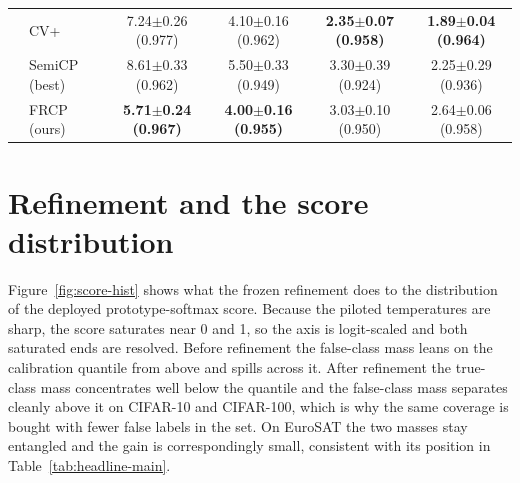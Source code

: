 \begin{table}[t]
\begin{tabular}{llcccc}
 & CV+ & 7.24$\pm$0.26 {\scriptsize(0.977)} & 4.10$\pm$0.16 {\scriptsize(0.962)} & \textbf{2.35$\pm$0.07 {\scriptsize(0.958)}} & \textbf{1.89$\pm$0.04 {\scriptsize(0.964)}}\\
 & SemiCP (best) & 8.61$\pm$0.33 {\scriptsize(0.962)} & 5.50$\pm$0.33 {\scriptsize(0.949)} & 3.30$\pm$0.39 {\scriptsize(0.924)} & 2.25$\pm$0.29 {\scriptsize(0.936)}\\
 & FRCP (ours) & \textbf{5.71$\pm$0.24 {\scriptsize(0.967)}} & \textbf{4.00$\pm$0.16 {\scriptsize(0.955)}} & 3.03$\pm$0.10 {\scriptsize(0.950)} & 2.64$\pm$0.06 {\scriptsize(0.958)}\\
\bottomrule
\end{tabular}
\end{table}
%
\section{Refinement and the score distribution}
\label{app:scorehist}

Figure~\ref{fig:score-hist} shows what the frozen refinement does to
the distribution of the deployed prototype-softmax score. Because the
piloted temperatures are sharp, the score saturates near 0 and 1, so
the axis is logit-scaled and both saturated ends are resolved. Before
refinement the false-class mass leans on the calibration quantile from
above and spills across it. After refinement the true-class mass
concentrates well below the quantile and the false-class mass
separates cleanly above it on CIFAR-10 and CIFAR-100, which is why the
same coverage is bought with fewer false labels in the set. On EuroSAT
the two masses stay entangled and the gain is correspondingly small,
consistent with its position in Table~\ref{tab:headline-main}.

